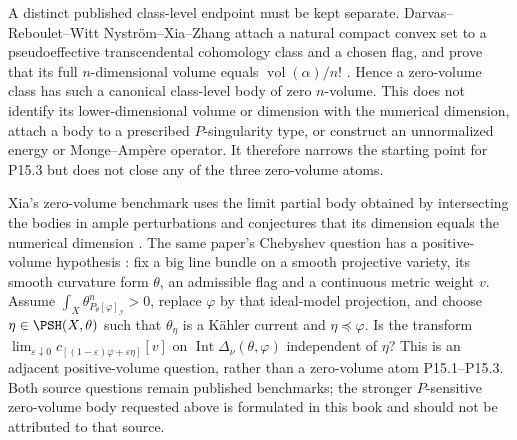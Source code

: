 A distinct published class-level endpoint must be kept separate.
Darvas--Reboulet--Witt Nystr\"om--Xia--Zhang attach a natural compact
convex set to a pseudoeffective transcendental cohomology class and a
chosen flag, and prove that its full \(n\)-dimensional volume equals
\(\operatorname{vol}(\alpha)/n!\) \cite[pp.~135--136]{DRWNXZ}.  Hence a
zero-volume class has such a canonical class-level body of zero
\(n\)-volume.  This does not identify its lower-dimensional volume or
dimension with the numerical dimension, attach a body to a prescribed
\(P\)-singularity type, or construct an unnormalized energy or
Monge--Amp\`ere operator.  It therefore narrows the starting point for
P15.3 but does not close any of the three zero-volume atoms.

Xia's zero-volume benchmark uses the limit partial body obtained by
intersecting the bodies in ample perturbations and conjectures that its
dimension equals the numerical dimension
\cite[Section~5.6 and Conjecture~5.29]{Xia21}.
The same paper's Chebyshev question has a positive-volume hypothesis
\cite[Section~6.4, p.~1325]{Xia21}: fix a big line bundle on a smooth
projective variety, its smooth curvature form \(\theta\), an admissible
flag and a continuous metric weight \(v\).  Assume
\(\int_X\theta_{P_\theta[\varphi]_{\mathcal I}}^n>0\), replace
\(\varphi\) by that ideal-model projection, and choose
\(\eta\in\PSH(X,\theta)\) such that \(\theta_\eta\) is a K\"ahler
current and \(\eta\preceq\varphi\).  Is the transform
\(\lim_{\varepsilon\downarrow0}
c_{[(1-\varepsilon)\varphi+\varepsilon\eta]}[v]\)
on \(\operatorname{Int}\Delta_\nu(\theta,\varphi)\) independent of
\(\eta\)?  This is an adjacent positive-volume question, rather than a
zero-volume atom P15.1--P15.3.  Both source questions remain published
benchmarks; the stronger \(P\)-sensitive zero-volume body requested above
is formulated in this book and should not be attributed to that source.

